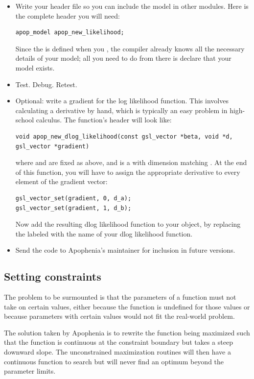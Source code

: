 \begin{itemize}
\item Write your header file so you can include the model in other
modules. Here is the complete header you will need:
\begin{lstlisting}
apop_model apop_new_likelihood;
\end{lstlisting}
Since the  is defined when you , the compiler already knows all the necessary
details of your model; all you need to do from there is declare that
your model exists.


\item Test. Debug. Retest.

\item Optional: write a gradient for the log likelihood function. This
involves calculating a derivative by hand, which is typically an easy
problem in high-school calculus. The function's header will look like: 
\begin{lstlisting}
void apop_new_dlog_likelihood(const gsl_vector *beta, void *d, gsl_vector *gradient)
\end{lstlisting}
where  and  are fixed as above, and  is a  with dimension matching . 
At the end of this function, you will have to assign the appropriate derivative to every element of the gradient vector:
\begin{lstlisting}
gsl_vector_set(gradient, 0, d_a);
gsl_vector_set(gradient, 1, d_b);
\end{lstlisting}
Now add the resulting dlog likelihood function to your object, by
replacing the  labeled  with
the name of your dlog likelihood function.  
\item Send the code to Apophenia's maintainer for inclusion in future
versions.  \end{itemize}


\subsection{Setting
constraints}\label{constraintwriting}

The problem to be surmounted is that the parameters of a function must not take on
certain values, either because the function is undefined for those
values or because parameters with certain values would not fit the
real-world problem.

The solution taken by Apophenia is to rewrite the function being maximized such that the
function is continuous at the constraint boundary but takes a steep
downward slope. The unconstrained maximization routines will then have a 
continuous function to search but will never find an optimum 
beyond the parameter limits.

